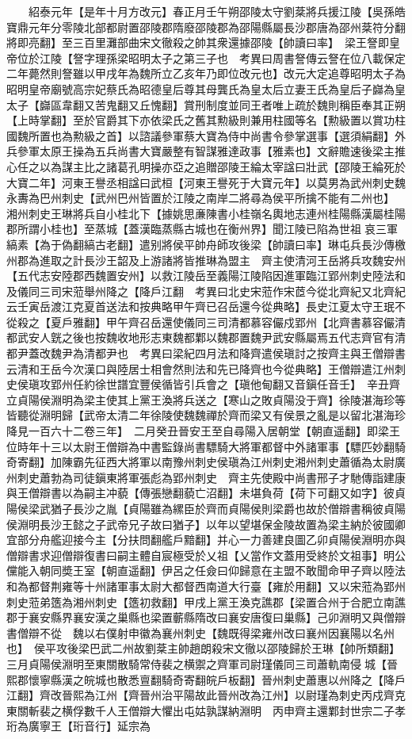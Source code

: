 　　紹泰元年【是年十月方改元】春正月壬午朔邵陵太守劉棻將兵援江陵【吳孫皓寶鼎元年分零陵北部都尉置邵陵郡隋廢邵陵郡為邵陽縣屬長沙郡唐為邵州棻符分翻將即亮翻】至三百里灘部曲宋文徹殺之帥其衆還據邵陵【帥讀曰率】　梁王詧即皇帝位於江陵【詧字理孫梁昭明太子之第三子也　考異曰周書詧傳云詧在位八載保定二年薨然則詧雖以甲戌年為魏所立乙亥年乃即位改元也】改元大定追尊昭明太子為昭明皇帝廟號高宗妃蔡氏為昭德皇后尊其母龔氏為皇太后立妻王氏為皇后子巋為皇太子【巋區韋翻又苦鬼翻又丘愧翻】賞刑制度並同王者唯上疏於魏則稱臣奉其正朔【上時掌翻】至於官爵其下亦依梁氏之舊其勲級則兼用柱國等名【勲級置以賞功柱國魏所置也為勲級之首】以諮議參軍蔡大寶為侍中尚書令參掌選事【選須絹翻】外兵參軍太原王操為五兵尚書大寶嚴整有智謀雅達政事【雅素也】文辭贍速後梁主推心任之以為謀主比之諸葛孔明操亦亞之追贈邵陵王綸太宰諡曰壯武【邵陵王綸死於大寶二年】河東王譽丞相諡曰武桓【河東王譽死于大寶元年】以莫男為武州刺史魏永夀為巴州刺史【武州巴州皆置於江陵之南岸二將尋為侯平所擒不能有二州也】　湘州刺史王琳將兵自小桂北下【據姚思亷陳書小桂嶺名輿地志連州桂陽縣漢屬桂陽郡所謂小桂也】至蒸城【蓋漢臨蒸縣古城也在衡州界】聞江陵已陷為世祖哀三軍縞素【為于偽翻縞古老翻】遣别將侯平帥舟師攻後梁【帥讀曰率】琳屯兵長沙傳檄州郡為進取之計長沙王韶及上游諸將皆推琳為盟主　齊主使清河王岳將兵攻魏安州【五代志安陸郡西魏置安州】以救江陵岳至義陽江陵陷因進軍臨江郢州刺史陸法和及儀同三司宋蒞舉州降之【降戶江翻　考異曰北史宋蒞作宋茝今從北齊紀又北齊紀云壬寅岳渡江克夏首送法和按典略甲午齊已召岳還今從典略】長史江夏太守王珉不從殺之【夏戶雅翻】甲午齊召岳還使儀同三司清都慕容儼戍郢州【北齊書慕容儼清都武安人皝之後也按魏收地形志東魏都鄴以魏郡置魏尹武安縣屬焉五代志齊官有清都尹蓋改魏尹為清都尹也　考異曰梁紀四月法和降齊遣侯瑱討之按齊主與王僧辯書云清和王岳今次漢口與陸居士相會然則法和先已降齊也今從典略】王僧辯遣江州刺史侯瑱攻郢州任約徐世譜宜豐侯循皆引兵會之【瑱他甸翻又音鎭任音壬】　辛丑齊立貞陽侯淵明為梁主使其上黨王渙將兵送之【寒山之敗貞陽没于齊】徐陵湛海珍等皆聽從淵明歸【武帝太清二年徐陵使魏魏禪於齊而梁又有侯景之亂是以留北湛海珍降見一百六十二卷三年】　二月癸丑晉安王至自尋陽入居朝堂【朝直遥翻】即梁王位時年十三以太尉王僧辯為中書監錄尚書驃騎大將軍都督中外諸軍事【驃匹妙翻騎奇寄翻】加陳霸先征西大將軍以南豫州刺史侯瑱為江州刺史湘州刺史蕭循為太尉廣州刺史蕭勃為司徒鎭東將軍張彪為郢州刺史　齊主先使殿中尚書邢子才馳傳詣建康與王僧辯書以為嗣主冲藐【傳張戀翻藐亡沼翻】未堪負荷【荷下可翻又如字】彼貞陽侯梁武猶子長沙之胤【貞陽雖為縲臣於齊而貞陽侯則梁爵也故於僧辯書稱彼貞陽侯淵明長沙王懿之子武帝兄子故曰猶子】以年以望堪保金陵故置為梁主納於彼國卿宜部分舟艦迎接今主【分扶問翻艦戶黯翻】并心一力善建良圖乙卯貞陽侯淵明亦與僧辯書求迎僧辯復書曰嗣主體自宸極受於乂祖【乂當作文蓋用受終於文祖事】明公儻能入朝同奬王室【朝直遥翻】伊呂之任僉曰仰歸意在主盟不敢聞命甲子齊以陸法和為都督荆雍等十州諸軍事太尉大都督西南道大行臺【雍於用翻】又以宋蒞為郢州刺史蒞弟簉為湘州刺史【簉初救翻】甲戌上黨王渙克譙郡【梁置合州于合肥立南譙郡于襄安縣界襄安漢之巢縣也梁置蘄縣隋改曰襄安唐復曰巢縣】己卯淵明又與僧辯書僧辯不從　魏以右僕射申徽為襄州刺史【魏既得梁雍州改曰襄州因襄陽以名州也】　侯平攻後梁巴武二州故劉棻主帥趙朗殺宋文徹以邵陵歸於王琳【帥所類翻】　三月貞陽侯淵明至東關散騎常侍裴之横禦之齊軍司尉瑾儀同三司蕭軌南侵城【晉熙郡懷寧縣漢之皖城也散悉亶翻騎奇寄翻皖戶板翻】晉州刺史蕭惠以州降之【降戶江翻】齊改晉熙為江州【齊晉州治平陽故此晉州改為江州】以尉瑾為刺史丙戍齊克東關斬裴之横俘數千人王僧辯大懼出屯姑孰謀納淵明　丙申齊主還鄴封世宗二子孝珩為廣寧王【珩音行】延宗為
